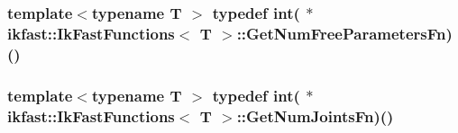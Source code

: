 \hypertarget{classikfast_1_1IkFastFunctions_a0dff63763caf3748a37703a8d2a0b257}{
\subsubsection[{Get\-Num\-Free\-Parameters\-Fn}]{\setlength{\rightskip}{0pt plus 5cm}template$<$typename T $>$ typedef int( $\ast$ {\bf ikfast\-::\-Ik\-Fast\-Functions}$<$ T $>$\-::Get\-Num\-Free\-Parameters\-Fn)()}}\label{classikfast_1_1IkFastFunctions_a0dff63763caf3748a37703a8d2a0b257}
\hypertarget{classikfast_1_1IkFastFunctions_ac56ef17997969248944c8ed23cbd713f}{
\subsubsection[{Get\-Num\-Joints\-Fn}]{\setlength{\rightskip}{0pt plus 5cm}template$<$typename T $>$ typedef int( $\ast$ {\bf ikfast\-::\-Ik\-Fast\-Functions}$<$ T $>$\-::Get\-Num\-Joints\-Fn)()}}\label{classikfast_1_1IkFastFunctions_ac56ef17997969248944c8ed23cbd713f}


